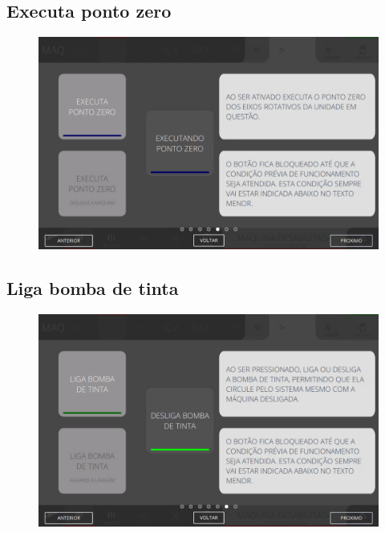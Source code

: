 \newpage
\thispagestyle{fancy}
\vspace{\fill}
\subsection{Executa ponto zero}
\begin{figure}
    \centering
    \includegraphics[width=576 px,height=360 px]{src/imagesICV/04-printters/02-printter/commands/5.png}
\end{figure}

\newpage
\thispagestyle{fancy}
\vspace{\fill}
\subsection{Liga bomba de tinta}
\begin{figure}
    \centering
    \includegraphics[width=576 px,height=360 px]{src/imagesICV/04-printters/02-printter/commands/6.png}
\end{figure}

